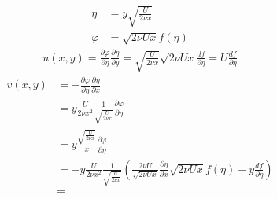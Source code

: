 \documentclass[french]{article}
\begin{document}
\begin{align*}
	\eta &= y \sqrt{\frac{U}{2\nu x }} \\
	\varphi &= \sqrt{2\nu U x} f(\eta)
\end{align*}
\begin{align*}
	u(x,y) = 
	\frac{\partial \varphi}{\partial \eta} 
	\frac{\partial \eta}{\partial y}
	=
	\sqrt{\frac{U}{2\nu x }} \sqrt{2\nu U x}\frac{d f}{\partial \eta}
	= U \frac{d f}{\partial \eta}
\end{align*}
\begin{align*}
	v(x,y) &= 
	-\frac{\partial \varphi}{\partial \eta} 
	\frac{\partial \eta}{\partial x}\\
	&=
	y\frac{U}{2\nu x^{2}}
	\frac{1}{\sqrt{\frac{U}{2\nu x}}}
	\frac{\partial \varphi}{\partial \eta}\\
	&=
	y\frac{\sqrt{\frac{U}{2\nu x}}}{x}
	\frac{\partial \varphi}{\partial \eta}\\
	&=
	-y\frac{U}{2\nu x^{2}}
	\frac{1}{\sqrt{\frac{U}{2\nu x}}}
	\left(
	\frac{2\nu U}{\sqrt{2\nu Ux }}\frac{\partial \eta}{\partial x}
	\sqrt{2\nu U x}f(\eta) +  y\frac{d f}{\partial \eta}
	\right)\\
	&=
\end{align*}

\end{document}
